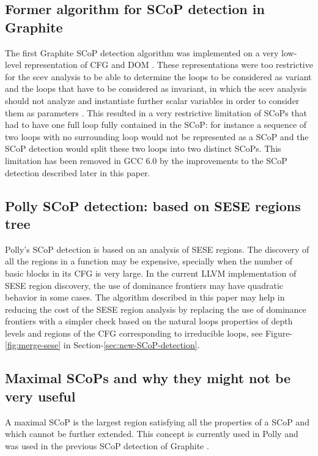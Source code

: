 \documentclass{sig-alternate}
\begin{document}
\subsection{Former algorithm for SCoP detection in Graphite}
\label{subsec:graphite-SCoP}
The first Graphite SCoP detection algorithm was implemented on a very low-level
representation of CFG and DOM \cite{graphite}.  These representations were too
restrictive for the scev analysis to be able to determine the loops to be
considered as variant and the loops that have to be considered as invariant, in
which the scev analysis should not analyze and instantiate further scalar
variables in order to consider them as parameters \cite{scev}.  This resulted in
a very restrictive limitation of SCoPs that had to have one full loop fully
contained in the SCoP: for instance a sequence of two loops with no surrounding
loop would not be represented as a SCoP and the SCoP detection would split these
two loops into two distinct SCoPs.  This limitation has been removed in GCC 6.0
by the improvements to the SCoP detection described later in this paper.

\subsection{Polly SCoP detection: based on SESE regions tree}
\label{subsec:polly-SCoP}
Polly's SCoP detection is based on an analysis of SESE regions.  The discovery
of all the regions in a function may be expensive, specially when the number of
basic blocks in its CFG is very large.  In the current LLVM implementation of
SESE region discovery, the use of dominance frontiers may have quadratic
behavior in some cases.  The algorithm described in this paper may help in
reducing the cost of the SESE region analysis by replacing the use of dominance
frontiers with a simpler check based on the natural loops properties of depth
levels and regions of the CFG corresponding to irreducible loops, see
Figure-\ref{fig:merge-sese} in Section-\ref{sec:new-SCoP-detection}.

\subsection{Maximal SCoPs and why they might not be very useful}
\label{subsec:maximality}
A maximal SCoP is the largest region satisfying all the properties of a SCoP and
which cannot be further extended.  This concept is currently used in Polly
\cite{polly} and was used in the previous SCoP detection of Graphite
\cite{graphite}.
\end{document}
